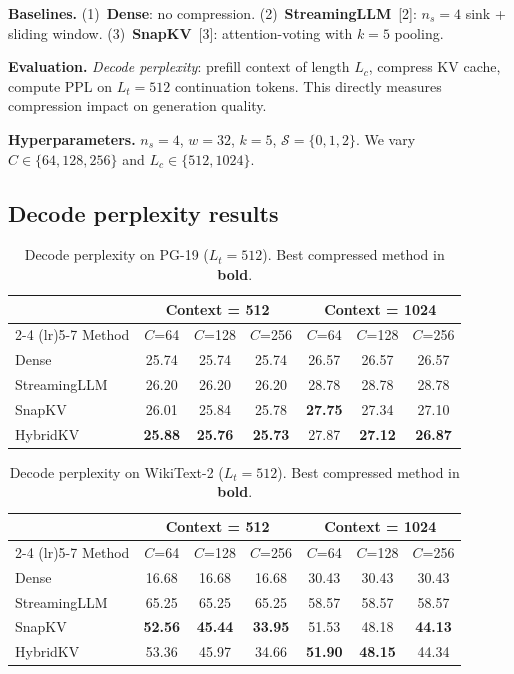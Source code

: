 \documentclass{article}
\begin{document}
\textbf{Baselines.} (1)~\textbf{Dense}: no compression. (2)~\textbf{StreamingLLM}~[2]: $n_s\!=\!4$ sink + sliding window. (3)~\textbf{SnapKV}~[3]: attention-voting with $k\!=\!5$ pooling.

\textbf{Evaluation.} \emph{Decode perplexity}: prefill context of length $L_c$, compress KV cache, compute PPL on $L_t\!=\!512$ continuation tokens. This directly measures compression impact on generation quality.

\textbf{Hyperparameters.} $n_s\!=\!4$, $w\!=\!32$, $k\!=\!5$, $\mathcal{S}\!=\!\{0,1,2\}$. We vary $C \in \{64, 128, 256\}$ and $L_c \in \{512, 1024\}$.

\subsection{Decode perplexity results}

\begin{table}[t]
\caption{Decode perplexity on PG-19 ($L_t = 512$). Best compressed method in \textbf{bold}.}
\label{tab:pg19}
\centering
\begin{tabular}{lcccccc}
\toprule
 & \multicolumn{3}{c}{Context = 512} & \multicolumn{3}{c}{Context = 1024} \\
\cmidrule(lr){2-4} \cmidrule(lr){5-7}
Method & $C$=64 & $C$=128 & $C$=256 & $C$=64 & $C$=128 & $C$=256 \\
\midrule
Dense & 25.74 & 25.74 & 25.74 & 26.57 & 26.57 & 26.57 \\
StreamingLLM & 26.20 & 26.20 & 26.20 & 28.78 & 28.78 & 28.78 \\
SnapKV & 26.01 & 25.84 & 25.78 & \textbf{27.75} & 27.34 & 27.10 \\
HybridKV & \textbf{25.88} & \textbf{25.76} & \textbf{25.73} & 27.87 & \textbf{27.12} & \textbf{26.87} \\
\bottomrule
\end{tabular}
\end{table}

\begin{table}[t]
\caption{Decode perplexity on WikiText-2 ($L_t = 512$). Best compressed method in \textbf{bold}.}
\label{tab:wikitext}
\centering
\begin{tabular}{lcccccc}
\toprule
 & \multicolumn{3}{c}{Context = 512} & \multicolumn{3}{c}{Context = 1024} \\
\cmidrule(lr){2-4} \cmidrule(lr){5-7}
Method & $C$=64 & $C$=128 & $C$=256 & $C$=64 & $C$=128 & $C$=256 \\
\midrule
Dense & 16.68 & 16.68 & 16.68 & 30.43 & 30.43 & 30.43 \\
StreamingLLM & 65.25 & 65.25 & 65.25 & 58.57 & 58.57 & 58.57 \\
SnapKV & \textbf{52.56} & \textbf{45.44} & \textbf{33.95} & 51.53 & 48.18 & \textbf{44.13} \\
HybridKV & 53.36 & 45.97 & 34.66 & \textbf{51.90} & \textbf{48.15} & 44.34 \\
\bottomrule
\end{tabular}
\end{table}
\end{document}
